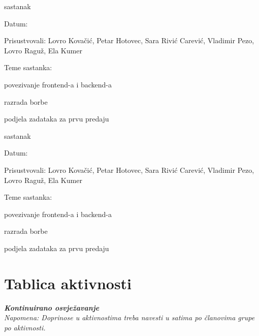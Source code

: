 \begin{packed_enum}
			\item  sastanak
			\item[] \begin{packed_item}
				\item Datum: 
				\item Prisustvovali: Lovro Kovačić, Petar Hotovec, Sara Rivić Carević, Vladimir Pezo, Lovro Raguž, Ela Kumer
				\item Teme sastanka:
				\begin{packed_item}
				    \item  povezivanje frontend-a i backend-a
				    \item  razrada borbe
				    \item  podjela zadataka za prvu predaju
				\end{packed_item}
			\end{packed_item}
			
			\item  sastanak
			\item[] \begin{packed_item}
				\item Datum: \DTMdisplaydate{2022}{11}{3}{-1}
				\item Prisustvovali: Lovro Kovačić, Petar Hotovec, Sara Rivić Carević, Vladimir Pezo, Lovro Raguž, Ela Kumer
				\item Teme sastanka:
				\begin{packed_item}
				    \item  povezivanje frontend-a i backend-a
				    \item  razrada borbe
				    \item  podjela zadataka za prvu predaju
				\end{packed_item}
			\end{packed_item}
			
		\end{packed_enum}
		
		\eject
		\section*{Tablica aktivnosti}
		
			\textbf{\textit{Kontinuirano osvježavanje}}\\
			
			 \textit{Napomena: Doprinose u aktivnostima treba navesti u satima po članovima grupe po aktivnosti.}

